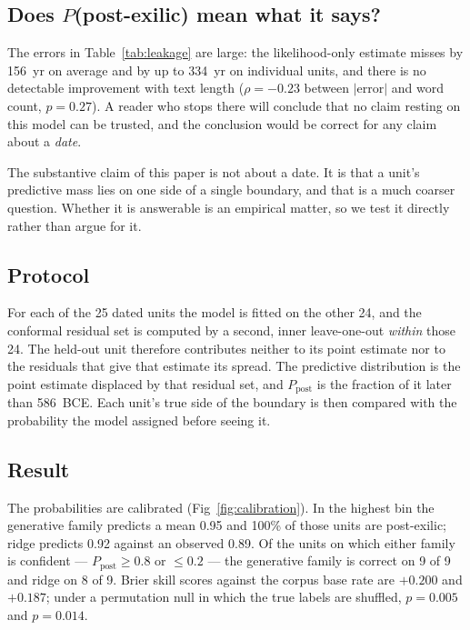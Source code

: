 \subsection*{Does $P$(post-exilic) mean what it says?}
\label{sec:postexilic_cal}

The errors in Table~\ref{tab:leakage} are large: the likelihood-only estimate
misses by 156~yr on average and by up to 334~yr on individual units, and
there is no detectable improvement with text length
($\rho = -0.23$ between $|$error$|$ and word count, $p = 0.27$).  A reader
who stops there will conclude that no claim resting on this model can be
trusted, and the conclusion would be correct for any claim about a
\emph{date}.

The substantive claim of this paper is not about a date.  It is that a unit's
predictive mass lies on one side of a single boundary, and that is a much
coarser question.  Whether it is answerable is an empirical matter, so we
test it directly rather than argue for it.

\subsection*{Protocol}

For each of the 25 dated units the model is fitted on the other 24, and the
conformal residual set is computed by a second, inner leave-one-out
\emph{within} those 24.  The held-out unit therefore contributes neither to
its point estimate nor to the residuals that give that estimate its spread.
The predictive distribution is the point estimate displaced by that residual
set, and $P_{\text{post}}$ is the fraction of it later than 586~BCE.  Each
unit's true side of the boundary is then compared with the probability the
model assigned before seeing it.

\subsection*{Result}

The probabilities are calibrated (Fig~\ref{fig:calibration}).  In the
highest bin the generative family predicts a mean 0.95 and 100\% of those
units are post-exilic; ridge predicts 0.92 against an observed 0.89.  Of the
units on which either family is confident --- $P_{\text{post}} \geq 0.8$ or
$\leq 0.2$ --- the generative family is correct on 9 of 9 and ridge on 8 of
9.  Brier skill scores against the corpus base rate are $+0.200$ and
$+0.187$; under a permutation null in which the true labels are shuffled,
$p = 0.005$ and $p = 0.014$.

